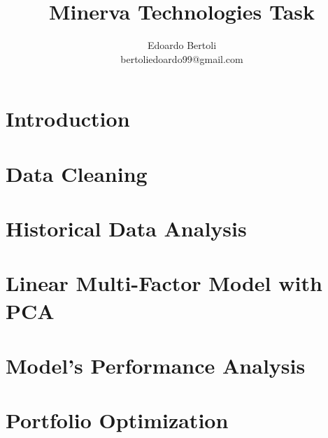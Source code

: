\documentclass[a4paper,11pt]{article}
\title{Minerva Technologies Task}
\author{Edoardo Bertoli\\bertoliedoardo99@gmail.com}
\begin{document}
\maketitle


\tableofcontents
\thispagestyle{empty} 
\clearpage





\section{Introduction}
\label{intro}


\section{Data Cleaning}
\label{datacleaning}


\section{Historical Data Analysis}
\label{dataanalysis}


\section{Linear Multi-Factor Model with PCA}
\label{pca-apt}


\section{Model's Performance Analysis}
\label{model-testing}


\section{Portfolio Optimization}
\label{optimization}



\clearpage
{}
\printbibliography
\end{document}
